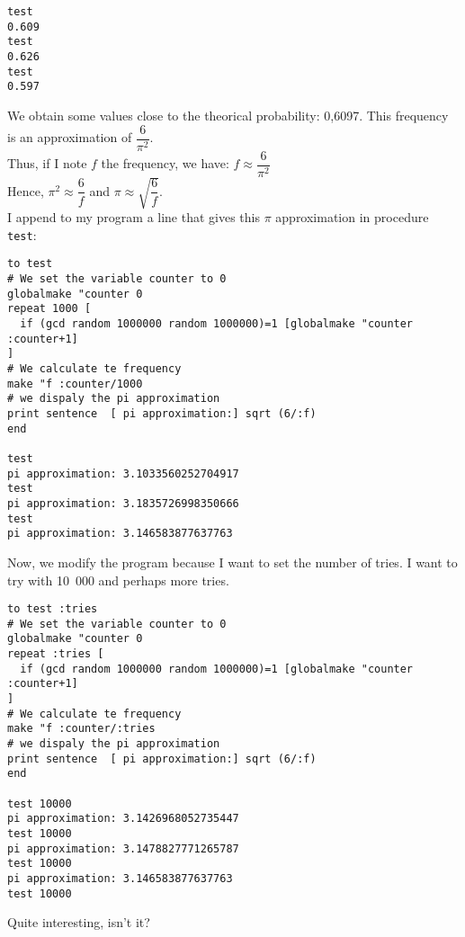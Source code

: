 \begin{verbatim}
test
0.609
test
0.626
test
0.597
\end{verbatim}
We obtain some values close to the theorical probability: 0,6097. This frequency is an approximation of $\dfrac{6}{\pi^2}$.\\
 Thus, if I note $f$ the frequency, we have: $f\approx \dfrac{6}{\pi^2}$ \\
Hence, $\pi^2\approx\dfrac{6}{f}$ and $\pi\approx\sqrt{\dfrac{6}{f}}$.\\
I append to my program a line that gives this $\pi$ approximation in procedure \texttt{test}:
\begin{verbatim}
to test
# We set the variable counter to 0
globalmake "counter 0
repeat 1000 [ 
  if (gcd random 1000000 random 1000000)=1 [globalmake "counter :counter+1]
]
# We calculate te frequency
make "f :counter/1000
# we dispaly the pi approximation
print sentence  [ pi approximation:] sqrt (6/:f)
end

test
pi approximation: 3.1033560252704917 
test
pi approximation: 3.1835726998350666 
test
pi approximation: 3.146583877637763 

\end{verbatim}
 Now, we modify the program because I want to set the number of tries. I want to try with 10\ 000 and perhaps more tries.
\begin{verbatim}
to test :tries
# We set the variable counter to 0
globalmake "counter 0
repeat :tries [ 
  if (gcd random 1000000 random 1000000)=1 [globalmake "counter :counter+1]
]
# We calculate te frequency
make "f :counter/:tries
# we dispaly the pi approximation
print sentence  [ pi approximation:] sqrt (6/:f)
end

test 10000
pi approximation: 3.1426968052735447 
test 10000
pi approximation: 3.1478827771265787 
test 10000
pi approximation: 3.146583877637763 
test 10000

\end{verbatim} 
 Quite interesting, isn't it?

